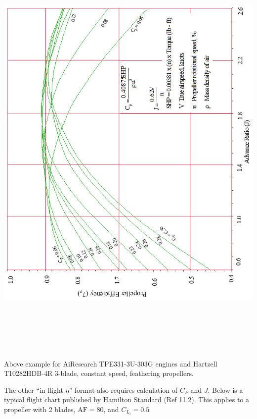 \documentclass[
]{book}
\begin{document}
\includegraphics[width=6.99931in,height=8.31181in]{media/11/image23.png}

Above example for AiResearch TPE331-3U-303G engines and Hartzell T10282HDB-4R 3-blade, constant speed, feathering propellers.

The other ``in-flight \(\eta\)'' format also requires calculation of \(C_P\) and \(J\). Below is a typical flight chart published by Hamilton Standard (Ref 11.2). This applies to a propeller with 2 blades, \(\mathrm{AF} = 80\), and \(C_{L_i} = 0.5\)
\end{document}
